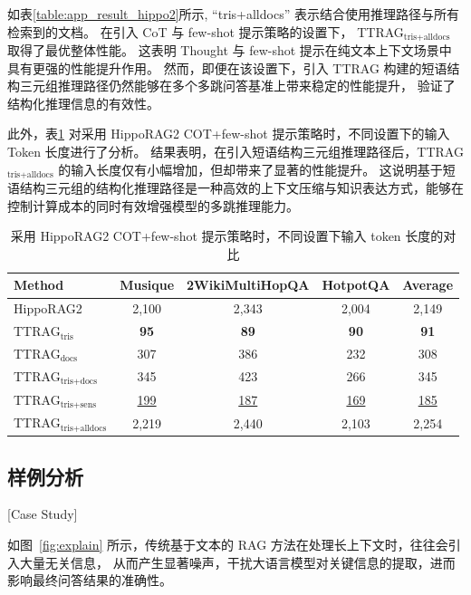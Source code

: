 如表\ref{table:app_result_hippo2}所示, “tris+alldocs” 表示结合使用推理路径与所有检索到的文档。
在引入 CoT 与 few-shot 提示策略的设置下，
TTRAG$_{\text{tris+alldocs}}$ 取得了最优整体性能。
这表明 Thought 与 few-shot 提示在纯文本上下文场景中具有更强的性能提升作用。
然而，即便在该设置下，引入 TTRAG 构建的短语结构三元组推理路径仍然能够在多个多跳问答基准上带来稳定的性能提升，
验证了结构化推理信息的有效性。

此外，表\ref{table:app_token_cost_hippo2} 对采用 HippoRAG2 COT+few-shot 提示策略时，不同设置下的输入 Token 长度进行了分析。
结果表明，在引入短语结构三元组推理路径后，TTRAG$_{\text{tris+alldocs}}$ 的输入长度仅有小幅增加，但却带来了显著的性能提升。
这说明基于短语结构三元组的结构化推理路径是一种高效的上下文压缩与知识表达方式，能够在控制计算成本的同时有效增强模型的多跳推理能力。

\begin{table}[htbp]
  \caption{采用 HippoRAG2 COT+few-shot 提示策略时，不同设置下输入 token 长度的对比}
  \label{table:app_token_cost_hippo2}
  \vspace{0.5em}\centering\wuhao
  \begin{tabular}{@{}lcccc@{}}
  \toprule[1.5pt]
  Method & Musique & 2WikiMultiHopQA & HotpotQA & Average \\
  \midrule[1pt]
  HippoRAG2           & 2,100 & 2,343 & 2,004 & 2,149 \\
  TTRAG$_\text{tris}$           & \textbf{95}   & \textbf{89}   & \textbf{90}   & \textbf{91} \\
  TTRAG$_\text{docs}$           & 307 & 386 & 232 & 308 \\
  TTRAG$_\text{tris+docs}$      & 345   & 423 & 266   & 345 \\
  TTRAG$_\text{tris+sens}$      & \underline{199}   & \underline{187}   & \underline{169}   & \underline{185} \\
  TTRAG$_\text{tris+alldocs}$ & 2,219 & 2,440 & 2,103 & 2,254 \\
  \bottomrule[1.5pt]
  \end{tabular}
\end{table}

\subsection{样例分析}[Case Study]

如图~\ref{fig:explain} 所示，传统基于文本的 RAG 方法在处理长上下文时，往往会引入大量无关信息，
从而产生显著噪声，干扰大语言模型对关键信息的提取，进而影响最终问答结果的准确性。

